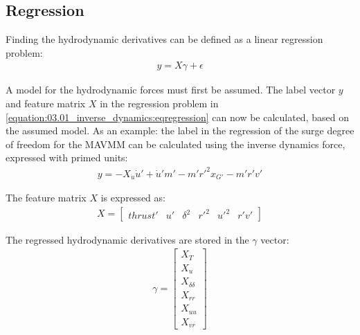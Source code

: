 \subsection{Regression}
Finding the hydrodynamic derivatives can be defined as a linear regression problem:
\begin{equation}\label{equation:03.01_inverse_dynamics:eqregression}
\begin{split}y = X\gamma + \epsilon\end{split}
\end{equation}

\noindent A model for the hydrodynamic forces must first be assumed.
The label vector \(y\) and feature matrix \(X\) in the regression problem in \autoref{equation:03.01_inverse_dynamics:eqregression} can now be calculated, based on the assumed model. As an example: the label in the regression of the surge degree of freedom for the MAVMM can be calculated using the inverse dynamics force, expressed with primed units:
\begin{equation}\label{equation:03.01_inverse_dynamics:diff_eq_X_y}
\begin{split}\displaystyle y = - X_{\dot{u}} \dot{u}' + \dot{u}' m' - m' r'^{2} x_{G'} - m' r' v'\end{split}
\end{equation}

\noindent The feature matrix \(X\) is expressed as:
\begin{equation}\label{equation:03.01_inverse_dynamics:diff_eq_X_X}
\begin{split}\displaystyle X = \left[\begin{matrix}thrust' & u' & \delta^{2} & r'^{2} & u'^{2} & r' v'\end{matrix}\right]\end{split}
\end{equation}

\noindent The regressed hydrodynamic derivatives are stored in the \(\gamma\) vector:
\begin{equation}\label{equation:03.01_inverse_dynamics:diff_eq_X_beta}
\begin{split}\displaystyle \gamma = \left[\begin{matrix}X_{T}\\X_{u}\\X_{\delta\delta}\\X_{rr}\\X_{uu}\\X_{vr}\end{matrix}\right]\end{split}
\end{equation}

